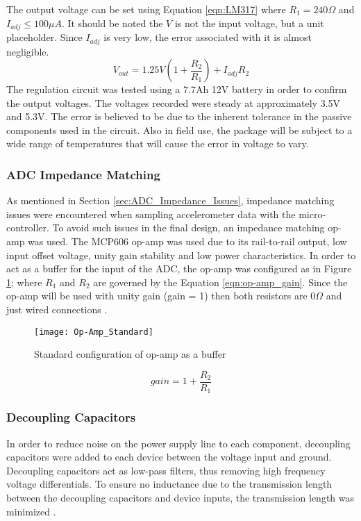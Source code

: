 The output voltage can be set using Equation \ref{eqn:LM317} where $R_1= 240\Omega$ and $I_{adj}\le 100\mu A$.
It should be noted the $V$ is not the input voltage, but a unit placeholder.
Since $I_{adj}$ is very low, the error associated with it is almost negligible. 
\begin{equation}
V_{out} = 1.25V(1+\frac{R_2}{R_1}) + I_{adj}R_2
\label{eqn:LM317}
\end{equation}
The regulation circuit was tested using a 7.7Ah 12V battery in order to confirm the output voltages. %
The voltages recorded were steady at approximately 3.5V and 5.3V.
The error is believed to be due to the inherent tolerance in the passive components used in the circuit.
Also in field use, the package will be subject to a wide range of temperatures that will cause the error in voltage to vary.

\subsubsection{ADC Impedance Matching}
\label{sec:ADC_Impedance_Matching}
As mentioned in Section \ref{sec:ADC_Impedance_Issues}, impedance matching issues were encountered when sampling accelerometer data with the micro-controller.
To avoid such issues in the final design, an impedance matching op-amp was used.
The MCP606 op-amp was used due to its rail-to-rail output, low input offset voltage, unity gain stability and low power characteristics. 
In order to act as a buffer for the input of the ADC, the op-amp was configured as in Figure \ref{fig:op-amp_standard}; where $R_1$ and $R_2$ are governed by the Equation \ref{eqn:op-amp_gain}. 
Since the op-amp will be used with unity gain (gain = 1) then both resistors are $0\Omega$ and just wired connections \cite{ArtofElectronics}.

\begin{figure}
\centering
\texttt{[image: Op-Amp\_Standard]}
\caption{Standard configuration of op-amp as a buffer}
\label{fig:op-amp_standard}
\end{figure}

\begin{equation}
gain = 1 + \frac{R_{2}}{R_{1}}
\label{eqn:op-amp_gain}
\end{equation}

\subsubsection{Decoupling Capacitors}
In order to reduce noise on the power supply line to each component, decoupling capacitors were added to each device between the voltage input and ground.
Decoupling capacitors act as low-pass filters, thus removing high frequency voltage differentials.
To ensure no inductance due to the transmission length between the decoupling capacitors and device inputs, the transmission length was minimized \cite{ArtofElectronics}.


